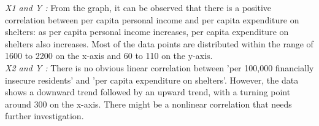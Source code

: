\documentclass[12pt,letterpaper]{article}
\begin{document}
\begin{itemize}
\begin{figure}[h!]
\begin{subfigure}[b]{0.45\textwidth}
		\label{fig:image2}
	\end{subfigure}
	\label{fig:main}
\end{figure}

\emph{X1 and Y :} From the graph, it can be observed that there is a positive correlation between per capita personal income and per capita expenditure on shelters: as per capita personal income increases, per capita expenditure on shelters also increases. Most of the data points are distributed within the range of 1600 to 2200 on the x-axis and 60 to 110 on the y-axis. \\
\emph{X2 and Y :} There is no obvious linear correlation between 'per 100,000 financially insecure residents' and 'per capita expenditure on shelters'. However, the data shows a downward trend followed by an upward trend, with a turning point around 300 on the x-axis. There might be a nonlinear correlation that needs further investigation.


\end{itemize}
\end{document}
